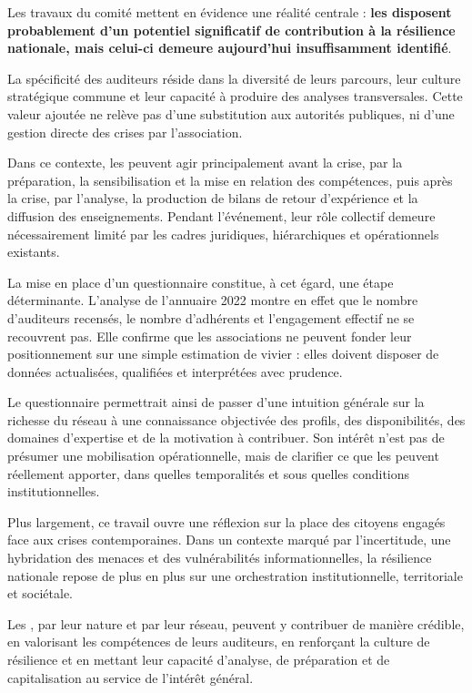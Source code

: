 Les travaux du comité mettent en évidence une réalité centrale : \textbf{les \AssociationsRegionalesIHEDN{} disposent probablement d'un potentiel significatif de contribution à la résilience nationale, mais celui-ci demeure aujourd'hui insuffisamment identifié}.

La spécificité des auditeurs réside dans la diversité de leurs parcours, leur culture stratégique commune et leur capacité à produire des analyses transversales. Cette valeur ajoutée ne relève pas d'une substitution aux autorités publiques, ni d'une gestion directe des crises par l'association.

Dans ce contexte, les \AssociationsRegionalesIHEDN{} peuvent agir principalement avant la crise, par la préparation, la sensibilisation et la mise en relation des compétences, puis après la crise, par l'analyse, la production de bilans de retour d'expérience et la diffusion des enseignements. Pendant l'événement, leur rôle collectif demeure nécessairement limité par les cadres juridiques, hiérarchiques et opérationnels existants.

La mise en place d'un questionnaire constitue, à cet égard, une étape déterminante. L'analyse de l'annuaire 2022 montre en effet que le nombre d'auditeurs recensés, le nombre d'adhérents et l'engagement effectif ne se recouvrent pas. Elle confirme que les associations ne peuvent fonder leur positionnement sur une simple estimation de vivier : elles doivent disposer de données actualisées, qualifiées et interprétées avec prudence.

Le questionnaire permettrait ainsi de passer d'une intuition générale sur la richesse du réseau à une connaissance objectivée des profils, des disponibilités, des domaines d'expertise et de la motivation à contribuer. Son intérêt n'est pas de présumer une mobilisation opérationnelle, mais de clarifier ce que les \AssociationsRegionalesIHEDN{} peuvent réellement apporter, dans quelles temporalités et sous quelles conditions institutionnelles.

Plus largement, ce travail ouvre une réflexion sur la place des citoyens engagés face aux crises contemporaines. Dans un contexte marqué par l'incertitude, une hybridation des menaces et des vulnérabilités informationnelles, la résilience nationale repose de plus en plus sur une orchestration institutionnelle, territoriale et sociétale.

Les \AssociationsRegionalesIHEDN{}, par leur nature et par leur réseau, peuvent y contribuer de manière crédible, en valorisant les compétences de leurs auditeurs, en renforçant la culture de résilience et en mettant leur capacité d'analyse, de préparation et de capitalisation au service de l'intérêt général.